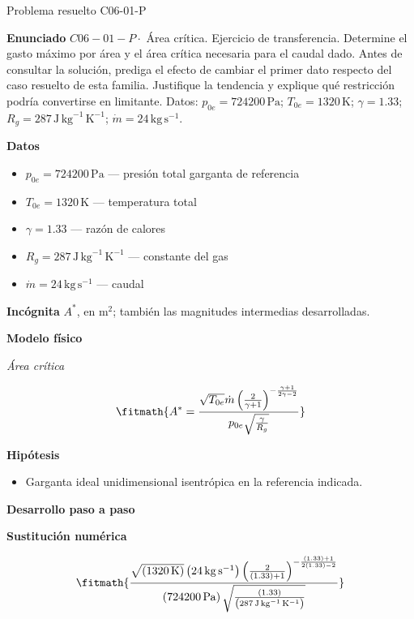 \documentclass[10pt,openany]{book}
\begin{document}
\begin{studiumworked}{Problema resuelto C06-01-P}


\noindent\textbf{Enunciado}
\(C06-01-P \cdot\) Área crítica. Ejercicio de transferencia. Determine el gasto máximo por área y el área crítica necesaria para el caudal dado. Antes de consultar la solución, prediga el efecto de cambiar el primer dato respecto del caso resuelto de esta familia. Justifique la tendencia y explique qué restricción podría convertirse en limitante. Datos: \(p_{0e}=724200\, \mathrm{Pa}\); \(T_{0e}=1320\, \mathrm{K}\); \(\gamma=1.33\); \(R_g=287\, \mathrm{J}\,\mathrm{kg}^{-1}\,\mathrm{K}^{-1}\); \(\dot m=24\, \mathrm{kg}\,\mathrm{s}^{-1}\).

\noindent\textbf{Datos}
\begin{itemize}
\item $p_{0e} = 724200\,\mathrm{Pa}$ — presión total garganta de referencia
\item $T_{0e} = 1320\,\mathrm{K}$ — temperatura total
\item $\gamma = 1.33$ — razón de calores
\item $R_g = 287\,\mathrm{J}\,\mathrm{kg}^{-1}\,\mathrm{K}^{-1}$ — constante del gas
\item $\dot m = 24\,\mathrm{kg}\,\mathrm{s}^{-1}$ — caudal
\end{itemize}

\noindent\textbf{Incógnita}
$A^{*}$, en $\mathrm{m^{2}}$; también las magnitudes intermedias desarrolladas.

\noindent\textbf{Modelo físico}

\noindent\textit{Área crítica}

\[
\fitmath{A^{*}=\frac{\sqrt{T_{0e}} \dot m \left(\frac{2}{\gamma + 1}\right)^{- \frac{\gamma + 1}{2 \gamma - 2}}}{p_{0e} \sqrt{\frac{\gamma}{R_g}}}}
\]

\noindent\textbf{Hipótesis}
\begin{itemize}
\item Garganta ideal unidimensional isentrópica en la referencia indicada.
\end{itemize}

\noindent\textbf{Desarrollo paso a paso}



\noindent\textbf{Sustitución numérica}

\[
\fitmath{\frac{\sqrt{\left(1320\,\mathrm{K}\right)} \left(24\,\mathrm{kg}\,\mathrm{s}^{-1}\right) \left(\frac{2}{\left(1.33\right) + 1}\right)^{- \frac{\left(1.33\right) + 1}{2 \left(1.33\right) - 2}}}{\left(724200\,\mathrm{Pa}\right) \sqrt{\frac{\left(1.33\right)}{\left(287\,\mathrm{J}\,\mathrm{kg}^{-1}\,\mathrm{K}^{-1}\right)}}}}
\]


\end{studiumworked}
\end{document}
